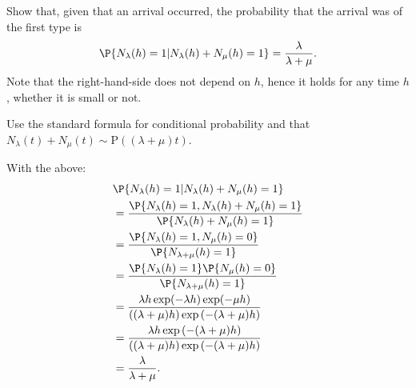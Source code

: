 \begin{comment}
  
\begin{exercise}
What is the
  meaning of the event
  $\{N_\lambda(h) = 1, N_\mu(h) = 0\}\cap\{N_\lambda(h) + N_\mu(h) = 1\}$?
    \begin{solution}
There are two arrival processes, arrivals of the first type occur with rate $\lambda$, arrivals of the second  type with rate $\mu$.  If the event  $\{N_\lambda(h) + N_\mu(h) = 1\}$ is true, it tells us that precisely one arrival occurred.  The event $\{N_\lambda(h) = 1, N_\mu(h) = 0\}$ means that up to time $t$, only an arrival of the first type occurred. Thus, the intersection of these events means that an arrival occurred \emph{and} that this arrival was of the first type. 
    \end{solution}
\end{exercise}
\end{comment}


\begin{exercise} 
Show that, given that an arrival occurred,  the probability that the arrival was of the first type is  
 \begin{equation*}
    \P{N_\lambda(h) = 1 | N_\lambda(h) + N_\mu(h) = 1} =
\frac{\lambda}{\lambda+\mu}.
    \end{equation*}
    Note that the right-hand-side does not depend on $h$, hence it
    holds for any time $h$, whether it is small or not.  
    \begin{hint}
Use the standard formula for conditional probability and that  $N_\lambda(t) + N_\mu(t) \sim \text{P}((\lambda + \mu)t)$.
    \end{hint}
    \begin{solution}
  With the above:
  \begin{align*}
&    \P{N_\lambda(h) = 1 | N_\lambda(h) + N_\mu(h) = 1} \\
&= \frac{\P{N_\lambda(h) = 1,  N_\lambda(h) + N_\mu(h) = 1} }{ \P{N_\lambda(h) + N_\mu(h) = 1}} \\ 
&= \frac{\P{N_\lambda(h) = 1,  N_\mu(h) = 0}}{ \P{N_{\lambda+\mu}(h) = 1}} \\ 
&= \frac{\P{N_\lambda(h) = 1}\P{N_\mu(h) = 0}}{ \P{N_{\lambda+\mu}(h)  = 1}} \\ 
&= \frac{\lambda h \exp(-\lambda h) \exp(-\mu h)}{((\lambda+\mu)h)\exp{(-(\lambda+\mu)h)}}\\
&= \frac{\lambda h \exp{(-(\lambda + \mu)h)}}{((\lambda+\mu)h)\exp{(-(\lambda+\mu)h)}}\\
&= \frac{\lambda}{\lambda+\mu}.
  \end{align*}
    \end{solution}
\end{exercise}


